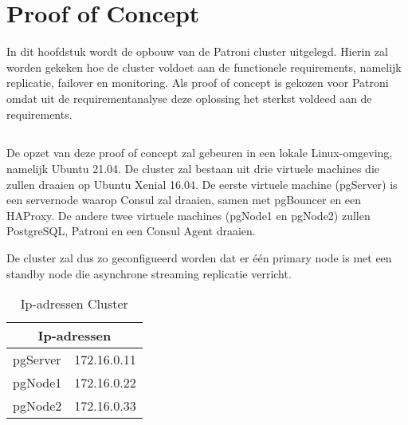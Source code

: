 
\chapter{Proof of Concept}
\label{ch:Proof of Concept}

In dit hoofdstuk wordt de opbouw van de Patroni cluster uitgelegd. Hierin zal worden gekeken hoe de cluster voldoet aan de functionele requirements, namelijk replicatie, failover en monitoring.
Als proof of concept is gekozen voor Patroni omdat uit de requirementanalyse deze oplossing het sterkst voldeed aan de requirements.

\section{}
\label{sec:Omgeving}
De opzet van deze proof of concept zal gebeuren in een lokale Linux-omgeving, namelijk Ubuntu 21.04.
De cluster zal bestaan uit drie virtuele machines die zullen draaien op Ubuntu Xenial 16.04. De eerste virtuele machine (pgServer) is een servernode waarop Consul zal draaien, samen met pgBouncer en een HAProxy. De andere twee virtuele machines (pgNode1 en pgNode2) zullen PostgreSQL, Patroni en een Consul Agent draaien.

De cluster zal dus zo geconfigueerd worden dat er één primary node is met een standby node die asynchrone streaming replicatie verricht.

\begin{table}
    \centering
    \begin{tabular}{ |p{6cm}||p{6cm}|  }
        \hline
        \multicolumn{2}{|c|}{Ip-adressen} \\
        \hline
        pgServer & 172.16.0.11 \\
        \hline
        pgNode1 & 172.16.0.22 \\
        \hline
        pgNode2 & 172.16.0.33 \\
        \hline
    \end{tabular}
    \caption{Ip-adressen Cluster}
    \label{table:Ip-adressen Cluster}
\end{table}

\section{}
\label{sec:Prerequisites}

